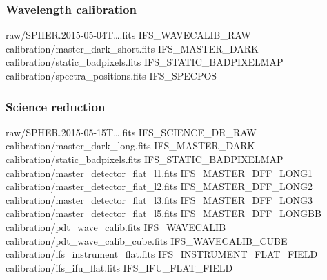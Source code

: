 \documentclass[twoside,single,12pt]{lion-msc}
\begin{document}
\subsubsection*{Wavelength calibration}
\begin{mdframed}[linewidth = 0.3mm, linecolor = black]
raw/SPHER.2015-05-04T\dots.fits IFS\_WAVECALIB\_RAW\\
calibration/master\_dark\_short.fits IFS\_MASTER\_DARK\\
calibration/static\_badpixels.fits IFS\_STATIC\_BADPIXELMAP\\
calibration/spectra\_positions.fits IFS\_SPECPOS
\end{mdframed}

\subsubsection*{Science reduction}
\begin{mdframed}[linewidth = 0.3mm, linecolor = black]
raw/SPHER.2015-05-15T\dots.fits IFS\_SCIENCE\_DR\_RAW\\
calibration/master\_dark\_long.fits IFS\_MASTER\_DARK\\
calibration/static\_badpixels.fits IFS\_STATIC\_BADPIXELMAP\\
calibration/master\_detector\_flat\_l1.fits IFS\_MASTER\_DFF\_LONG1\\
calibration/master\_detector\_flat\_l2.fits IFS\_MASTER\_DFF\_LONG2\\
calibration/master\_detector\_flat\_l3.fits IFS\_MASTER\_DFF\_LONG3\\
calibration/master\_detector\_flat\_l5.fits IFS\_MASTER\_DFF\_LONGBB\\
calibration/pdt\_wave\_calib.fits IFS\_WAVECALIB\\
calibration/pdt\_wave\_calib\_cube.fits IFS\_WAVECALIB\_CUBE\\
calibration/ifs\_instrument\_flat.fits IFS\_INSTRUMENT\_FLAT\_FIELD\\
calibration/ifs\_ifu\_flat.fits IFS\_IFU\_FLAT\_FIELD
\end{mdframed}
\end{document}
